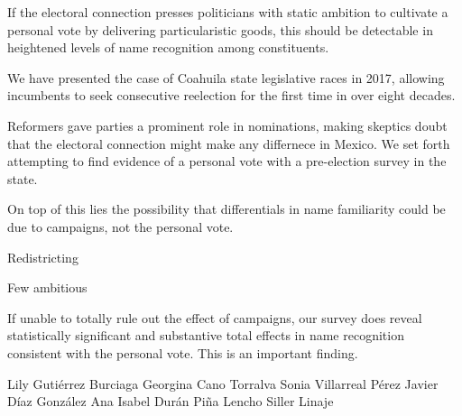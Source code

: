 
If the electoral connection presses politicians with static ambition to cultivate a personal vote by delivering particularistic goods, this should be detectable in heightened levels of name recognition among constituents.

We have presented the case of Coahuila state legislative races in 2017, allowing incumbents to seek consecutive reelection for the first time in over eight decades.

Reformers gave parties a prominent role in nominations, making skeptics doubt that the electoral connection might make any differnece in Mexico. We set forth attempting to find evidence of a personal vote with a pre-election survey in the state. 

On top of this lies the possibility that differentials in name familiarity could be due to campaigns, not the personal vote.

Redistricting 

Few ambitious

If unable to totally rule out the effect of campaigns, our survey does reveal statistically significant and substantive total effects in name recognition consistent with the personal vote. This is an important finding. 



  Lily Gutiérrez Burciaga     
  Georgina Cano Torralva     
  Sonia Villarreal Pérez     
  Javier Díaz González       
  Ana Isabel Durán Piña      
  Lencho Siller Linaje







